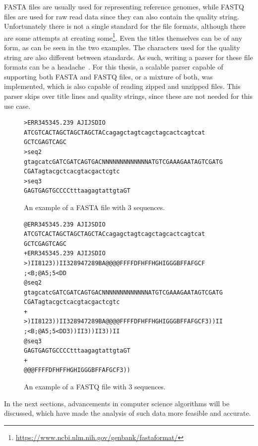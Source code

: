 FASTA files are usually used for representing reference genomes, while FASTQ files are used for raw read data since they can also contain the quality string.
Unfortunately there is not a single standard for the file formats, although there are some attempts at creating some\footnote{\url{https://www.ncbi.nlm.nih.gov/genbank/fastaformat/}}.
Even the titles themselves can be of any form, as can be seen in the two examples.
The characters used for the quality string are also different between standards.
As such, writing a parser for these file formats can be a headache~\cite{FastaAndFastq}.
For this thesis, a scalable parser capable of supporting both FASTA and FASTQ files, or a mixture of both, was implemented, which is also capable of reading zipped and unzipped files.
This parser skips over title lines and quality strings, since these are not needed for this use case.

\begin{figure}
\centering
\begin{lstlisting}[basicstyle=\footnotesize\ttfamily]
>ERR345345.239 AJIJSDIO
ATCGTCACTAGCTAGCTAGCTACcagagctagtcagctagcactcagtcat
GCTCGAGTCAGC
>seq2
gtagcatcGATCGATCAGTGACNNNNNNNNNNNNNATGTCGAAAGAATAGTCGATG
CGATagtacgctcacgtacgactcgtc
>seq3
GAGTGAGTGCCCCtttaagagtattgtaGT
\end{lstlisting}
\caption{An example of a FASTA file with 3 sequences.}\label{fig:FASTA}
\end{figure}

\begin{figure}
\centering
\begin{lstlisting}[basicstyle=\footnotesize\ttfamily]
@ERR345345.239 AJIJSDIO
ATCGTCACTAGCTAGCTAGCTACcagagctagtcagctagcactcagtcat
GCTCGAGTCAGC
+ERR345345.239 AJIJSDIO
>)II8123))II328947289BA@@@@FFFFDFHFFHGHIGGGBFFAFGCF
;<B;@A5;5<DD
@seq2
gtagcatcGATCGATCAGTGACNNNNNNNNNNNNNATGTCGAAAGAATAGTCGATG
CGATagtacgctcacgtacgactcgtc
+
>)II8123))II328947289BA@@@@FFFFDFHFFHGHIGGGBFFAFGCF3))II
;<B;@A5;5<DD3))II3))II3))II
@seq3
GAGTGAGTGCCCCtttaagagtattgtaGT
+
@@@FFFFDFHFFHGHIGGGBFFAFGCF3))
\end{lstlisting}
\caption{An example of a FASTQ file with 3 sequences.}\label{fig:FASTQ}
\end{figure}

In the next sections, advancements in computer science algorithms will be discussed, which have made the analysis of such data more feasible and accurate.
